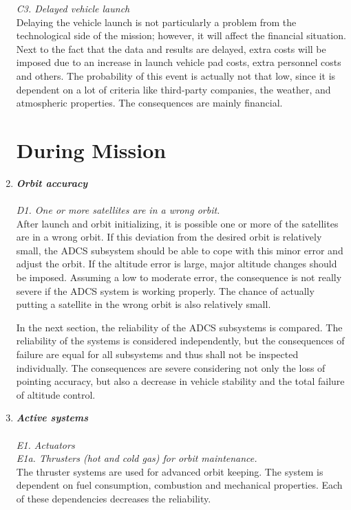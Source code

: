\documentclass[11pt]{report}
\begin{document}
\begin{enumerate}[A]
\textit{C3. Delayed vehicle launch}\\
Delaying the vehicle launch is not particularly a problem from the technological side of the mission; however, it will affect the financial situation. Next to the fact that the data and results are delayed, extra costs will be imposed due to an increase in launch vehicle pad costs, extra personnel costs and others. The probability of this event is actually not that low, since it is dependent on a lot of criteria like third-party companies, the weather, and atmospheric properties. The consequences are mainly financial.

\section{During Mission}
\label{blTRADm}
	\item  \textbf{\textit{Orbit accuracy }} \\\\
\textit{D1. One or more satellites are in a wrong orbit.}\\
After launch and orbit initializing, it is possible one or more of the satellites are in a wrong orbit. If this deviation from the desired orbit is relatively small, the ADCS subsystem should be able to cope with this minor error and adjust the orbit. If the altitude error is large, major altitude changes should be imposed. Assuming a low to moderate error, the consequence is not really severe if the ADCS system is working properly. The chance of actually putting a satellite in the wrong orbit is also relatively small.

In the next section, the reliability of the ADCS subsystems is compared. The reliability of the systems is considered independently, but the consequences of failure are equal for all subsystems and thus shall not be inspected individually. The consequences are severe considering not only the loss of pointing accuracy, but also a decrease in vehicle stability and the total failure of altitude control.  	

	\item  \textbf{\textit{Active systems}} \\\\
\textit{E1. Actuators}\\

\textit{E1a. Thrusters (hot and cold gas) for orbit maintenance.}\\ 
The thruster systems are used for advanced orbit keeping. The system is dependent on fuel consumption, combustion and mechanical properties. Each of these dependencies decreases the reliability. 


\end{enumerate}
\end{document}
